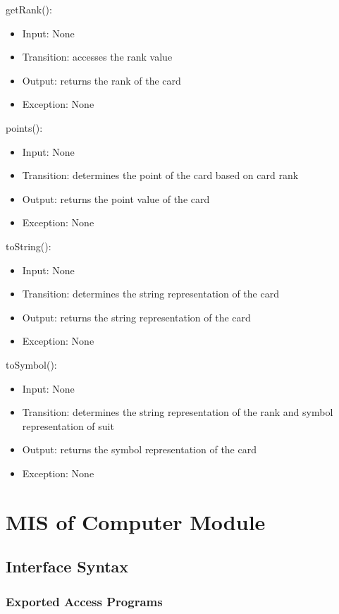 \documentclass[12pt, titlepage]{article}
\begin{document}
\noindent getRank():
\begin{itemize}
    \item Input: None
    \item Transition: accesses the rank value
    \item Output: returns the rank of the card
    \item Exception: None
\end{itemize}

\noindent points():
\begin{itemize}
    \item Input: None
    \item Transition: determines the point of the card based on card rank
    \item Output: returns the point value of the card
    \item Exception: None
\end{itemize}

\noindent toString():
\begin{itemize}
    \item Input: None
    \item Transition: determines the string representation of the card
    \item Output: returns the string representation of the card
    \item Exception: None
\end{itemize}

\noindent toSymbol():
\begin{itemize}
    \item Input: None
    \item Transition: determines the string representation of the rank and symbol representation of suit
    \item Output: returns the symbol representation of the card
    \item Exception: None
\end{itemize}

\section{MIS of Computer Module}
\subsection{Interface Syntax}
\subsubsection{Exported Access Programs}
\end{document}
